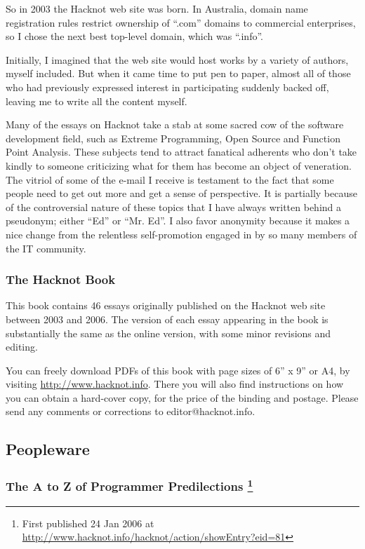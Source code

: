 \documentclass{article}
\begin{document}
So in 2003 the Hacknot web site was born. In Australia, domain name
registration rules restrict ownership of “.com” domains to commercial
enterprises, so I chose the next best top-level domain, which was
“.info”.

Initially, I imagined that the web site would host works by a variety of
authors, myself included. But when it came time to put pen to paper,
almost all of those who had previously expressed interest in
participating suddenly backed off, leaving me to write all the content
myself.

Many of the essays on Hacknot take a stab at some sacred cow of the
software development field, such as Extreme Programming, Open Source and
Function Point Analysis. These subjects tend to attract fanatical
adherents who don't take kindly to someone criticizing what for them has
become an object of veneration. The vitriol of some of the e-mail I
receive is testament to the fact that some people need to get out more
and get a sense of perspective. It is partially because of the
controversial nature of these topics that I have always written behind a
pseudonym; either “Ed” or “Mr. Ed”. I also favor anonymity because it
makes a nice change from the relentless self-promotion engaged in by so
many members of the IT community.

\subsubsection{The Hacknot Book}
\label{sec:orgheadline2}

This book contains 46 essays originally published on the Hacknot web
site between 2003 and 2006. The version of each essay appearing in the
book is substantially the same as the online version, with some minor
revisions and editing.

You can freely download PDFs of this book with page sizes of 6” x 9” or
A4, by visiting \url{http://www.hacknot.info}. There you will also find
instructions on how you can obtain a hard-cover copy, for the price of
the binding and postage. Please send any comments or corrections to
editor@hacknot.info.

\subsection{Peopleware}
\label{sec:orgheadline135}

\subsubsection{The A to Z of Programmer Predilections  \footnote{First published 24 Jan 2006 at
\url{http://www.hacknot.info/hacknot/action/showEntry?eid=81}}}
\label{sec:orgheadline30}
\end{document}
